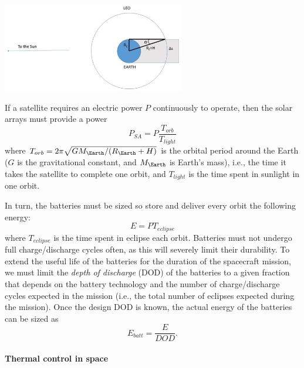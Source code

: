 \begin{center}
\includegraphics[width=0.6\textwidth]{figs/eclipse.jpg}
\end{center}

If a satellite requires an electric power $P$ continuously to operate,
then the solar arrays must provide a power
%
\begin{equation}
P_{SA} = P \frac{T_{orb}}{T_{light}}
\end{equation}
%
where $T_{orb} = 2\pi \sqrt{GM_\Earth/(R_\Earth+H)}$ is the 
orbital period around the Earth ($G$ is the gravitational constant,
and $M_\Earth$ is Earth's mass), i.e., the
time it takes the satellite to complete one orbit, and $T_{light}$ is the
time spent in sunlight in one orbit.

In turn, the batteries must be sized so store and deliver every orbit the 
following energy:
%
\begin{equation}
E = P T_{eclipse}
\end{equation}
%
where $T_{eclipse}$ is the time spent in eclipse each orbit. Batteries must 
not undergo full charge/discharge cycles often, as this will severely limit
their durability. To extend the useful life of the batteries for the duration
of the spacecraft mission, we must limit the \emph{depth of discharge} (DOD) 
of the batteries to a given fraction that depends on the battery technology
and the number of charge/discharge cycles expected in the mission (i.e., the
total number of eclipses expected during the mission).
Once the design DOD is known, the actual energy of the batteries can be sized
as
%
\begin{equation}
E_{batt} = \frac{E}{DOD}.
\end{equation}

\paragraph{Thermal control in space}

